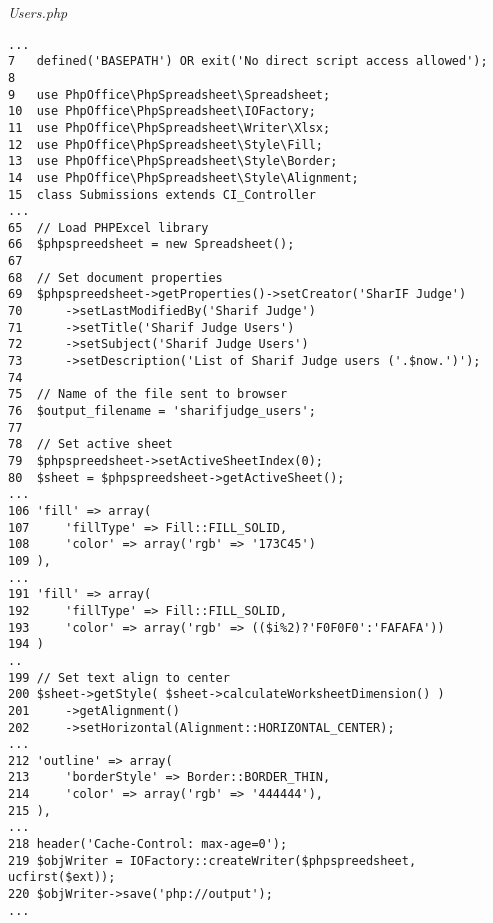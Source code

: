 \textit{Users.php}
\begin{lstlisting}[basicstyle=\ttfamily, frame=single,
columns=fullflexible, keepspaces=true, breaklines=true]
...
7	defined('BASEPATH') OR exit('No direct script access allowed');
8
9	use PhpOffice\PhpSpreadsheet\Spreadsheet;
10	use PhpOffice\PhpSpreadsheet\IOFactory;
11	use PhpOffice\PhpSpreadsheet\Writer\Xlsx;
12	use PhpOffice\PhpSpreadsheet\Style\Fill;
13	use PhpOffice\PhpSpreadsheet\Style\Border;
14	use PhpOffice\PhpSpreadsheet\Style\Alignment;
15	class Submissions extends CI_Controller
...
65	// Load PHPExcel library
66	$phpspreedsheet = new Spreadsheet();
67	
68	// Set document properties
69	$phpspreedsheet->getProperties()->setCreator('SharIF Judge')
70		->setLastModifiedBy('Sharif Judge')
71		->setTitle('Sharif Judge Users')
72		->setSubject('Sharif Judge Users')
73		->setDescription('List of Sharif Judge users ('.$now.')');
74	
75	// Name of the file sent to browser
76	$output_filename = 'sharifjudge_users';
77	
78	// Set active sheet
79	$phpspreedsheet->setActiveSheetIndex(0);
80	$sheet = $phpspreedsheet->getActiveSheet();
...
106	'fill' => array(
107		'fillType' => Fill::FILL_SOLID,
108		'color' => array('rgb' => '173C45')
109	),
...
191	'fill' => array(
192		'fillType' => Fill::FILL_SOLID,
193		'color' => array('rgb' => (($i%2)?'F0F0F0':'FAFAFA'))
194	)
..
199	// Set text align to center
200	$sheet->getStyle( $sheet->calculateWorksheetDimension() )
201		->getAlignment()
202		->setHorizontal(Alignment::HORIZONTAL_CENTER);
...
212	'outline' => array(
213		'borderStyle' => Border::BORDER_THIN,
214		'color' => array('rgb' => '444444'),
215	),
...
218	header('Cache-Control: max-age=0');
219	$objWriter = IOFactory::createWriter($phpspreedsheet, ucfirst($ext));
220	$objWriter->save('php://output');
...
\end{lstlisting}